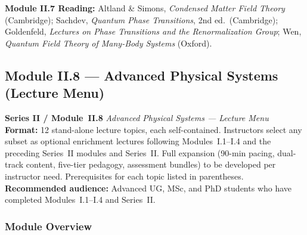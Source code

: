 \documentclass[11pt,a4paper]{article}
\begin{document}
\begin{tcolorbox}[highlightbox]
\textbf{Module II.7 Reading:}
Altland \& Simons, \textit{Condensed Matter Field Theory} (Cambridge);
Sachdev, \textit{Quantum Phase Transitions}, 2nd ed.\ (Cambridge);
Goldenfeld, \textit{Lectures on Phase Transitions and the Renormalization Group};
Wen, \textit{Quantum Field Theory of Many-Body Systems} (Oxford).
\end{tcolorbox}

\newpage

\subsection{Module II.8 --- Advanced Physical Systems (Lecture Menu)}
\label{sec:mod-II8}

\begin{tcolorbox}[seriesbox]
  \textbf{Series II / Module~II.8} \quad
  \textit{Advanced Physical Systems --- Lecture Menu}\\[4pt]
  \textbf{Format:} 12 stand-alone lecture topics, each self-contained.
  Instructors select any subset as optional enrichment lectures following
  Modules~I.1--I.4 and the preceding Series~II modules and Series~II. Full expansion (90-min pacing, dual-track content,
  five-tier pedagogy, assessment bundles) to be developed per instructor need.
  Prerequisites for each topic listed in parentheses.\\[4pt]
  \textbf{Recommended audience:} Advanced UG, MSc, and PhD students who have
  completed Modules~I.1--I.4 and Series~II.
\end{tcolorbox}

\medskip

\subsubsection*{Module Overview}
\end{document}
